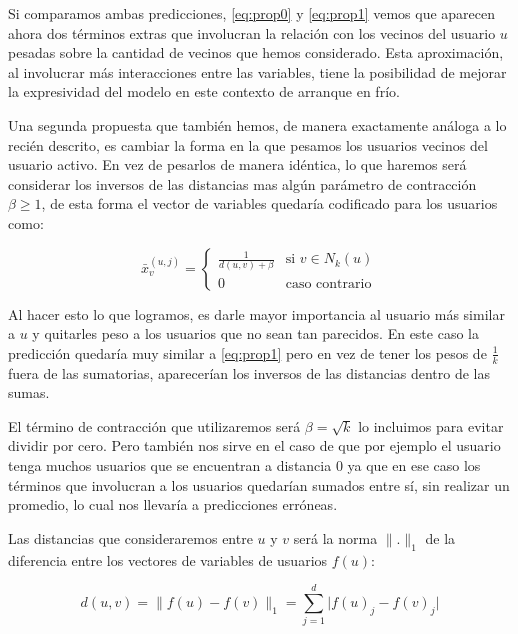 \documentclass[hidelinks,12pt,a4paper]{book}
\providecommand{\abs}[1]{\lvert#1\rvert}
\providecommand{\norm}[1]{\lVert#1\rVert}
\theoremstyle{plain}
\theoremstyle{definition}
\begin{document}
Si comparamos ambas predicciones, \eqref{eq:prop0} y \eqref{eq:prop1} vemos que aparecen ahora dos términos extras que involucran la relación con los vecinos del usuario $u$ pesadas sobre la cantidad de vecinos que hemos considerado. Esta aproximación, al involucrar más interacciones entre las variables, tiene la posibilidad de mejorar la expresividad del modelo en este contexto de arranque en frío.

Una segunda propuesta que también hemos, de manera exactamente análoga a lo recién descrito, es cambiar la forma en la que pesamos los usuarios vecinos del usuario activo. En vez de pesarlos de manera idéntica, lo que haremos será considerar los inversos de  las distancias mas algún parámetro de contracción $\beta \geq 1$, de esta forma el vector de variables quedaría codificado para los usuarios como: 

\begin{equation}
\label{prop2}
\bar{x}_v^{(u,j)}=
\begin{cases}
\frac{1}{d(u,v)+\beta} &\text{si } v\in N_k(u) \\
0 &\text{caso contrario}
\end{cases}
\end{equation}

Al hacer esto lo que logramos, es darle mayor importancia al usuario más similar a $u$ y quitarles peso a los usuarios que no sean tan parecidos. En este caso la predicción quedaría muy similar a \eqref{eq:prop1} pero en vez de tener los pesos de $\frac{1}{k}$ fuera de las sumatorias, aparecerían los inversos de las distancias dentro de las sumas.

El término de contracción que utilizaremos será $\beta = \sqrt{k}$ lo incluimos para evitar dividir por cero. Pero también nos sirve en el caso de que por ejemplo el usuario tenga muchos usuarios que se encuentran a distancia 0 ya que en ese caso los términos que involucran a los usuarios quedarían sumados entre sí, sin realizar un promedio, lo cual nos llevaría a predicciones erróneas.

Las distancias que consideraremos entre $u$ y $v$ será la norma $\norm{.}_1$ de la diferencia entre los vectores de variables de usuarios $f(u)$:

\begin{equation}
\label{eq:manhattan}
d(u,v) = \norm{f(u)-f(v)}_1 = \sum_{j=1}^d \abs{f(u)_j-f(v)_j}
\end{equation}

\end{document}
